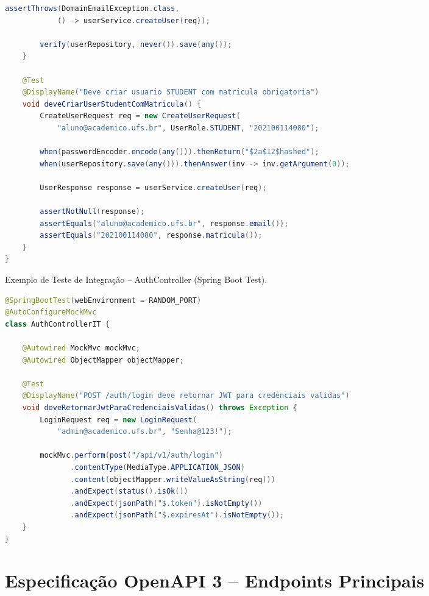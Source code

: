 \begin{apendicesenv}
\begin{codigo}[htb]
\begin{lstlisting}[language=Java]
        assertThrows(DomainEmailException.class,
            () -> userService.createUser(req));

        verify(userRepository, never()).save(any());
    }

    @Test
    @DisplayName("Deve criar usuario STUDENT com matricula obrigatoria")
    void deveCriarUserStudentComMatricula() {
        CreateUserRequest req = new CreateUserRequest(
            "aluno@academico.ufs.br", UserRole.STUDENT, "202100114080");

        when(passwordEncoder.encode(any())).thenReturn("$2a$12$hashed");
        when(userRepository.save(any())).thenAnswer(inv -> inv.getArgument(0));

        UserResponse response = userService.createUser(req);

        assertNotNull(response);
        assertEquals("aluno@academico.ufs.br", response.email());
        assertEquals("202100114080", response.matricula());
    }
}
\end{lstlisting}
\end{codigo}

\begin{codigo}[htb]
\caption{Exemplo de Teste de Integração -- AuthController (Spring Boot Test).}
\label{cod_teste_auth}
\begin{lstlisting}[language=Java]
@SpringBootTest(webEnvironment = RANDOM_PORT)
@AutoConfigureMockMvc
class AuthControllerIT {

    @Autowired MockMvc mockMvc;
    @Autowired ObjectMapper objectMapper;

    @Test
    @DisplayName("POST /auth/login deve retornar JWT para credenciais validas")
    void deveRetornarJwtParaCredenciaisValidas() throws Exception {
        LoginRequest req = new LoginRequest(
            "admin@academico.ufs.br", "Senha@123!");

        mockMvc.perform(post("/api/v1/auth/login")
               .contentType(MediaType.APPLICATION_JSON)
               .content(objectMapper.writeValueAsString(req)))
               .andExpect(status().isOk())
               .andExpect(jsonPath("$.token").isNotEmpty())
               .andExpect(jsonPath("$.expiresAt").isNotEmpty());
    }
}
\end{lstlisting}
\end{codigo}

\chapter{Especificação OpenAPI 3 -- Endpoints Principais}
\label{apend_openapi}


\end{apendicesenv}

